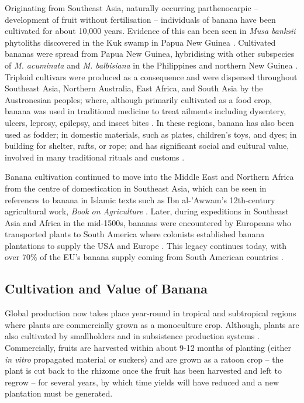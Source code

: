 Originating from Southeast Asia, naturally occurring parthenocarpic – development of fruit without fertilisation – individuals of banana have been cultivated for about 10,000 years. Evidence of this can been seen in \textit{Musa banksii} phytoliths discovered in the Kuk swamp in Papua New Guinea \parencite{Denham2011}.  Cultivated bananas were spread from Papua New Guinea, hybridising with other subspecies of \textit{M. acuminata} and \textit{M. balbisiana} in the Philippines and northern New Guinea \parencite{Perrier2009}. Triploid cultivars were produced as a consequence and were dispersed throughout Southeast Asia, Northern Australia, East Africa, and South Asia by the Austronesian peoples; where, although primarily cultivated as a food crop, banana was used in traditional medicine to treat ailments including dysentery, ulcers, leprosy, epilepsy, and insect bites \parencite{Kumar2012}. In these regions, banana has also been used as fodder; in domestic materials, such as plates, children’s toys, and dyes; in building for shelter, rafts, or rope; and has significant social and cultural value, involved in many traditional rituals and customs \parencite{Hapsari2017} .  

Banana cultivation continued to move into the Middle East and Northern Africa from the centre of domestication in Southeast Asia, which can be seen in references to banana in Islamic texts such as Ibn al-'Awwam's 12th-century agricultural work, \textit{Book on Agriculture} \parencite{Clement1866}. Later, during expeditions in Southeast Asia and Africa in the mid-1500s, bananas were encountered by Europeans who transported plants to South America where colonists established banana plantations to supply the USA and Europe \parencite{Guzman-Rivas1960, Salas-Pascual2022}. This legacy continues today, with over 70\% of the EU’s banana supply coming from South American countries \parencite{EuropeanUnion2022}.  

\subsection{Cultivation and Value of Banana}

Global production now takes place year-round in tropical and subtropical regions where plants are commercially grown as a monoculture crop. Although, plants are also cultivated by smallholders and in subsistence production systems \parencite{Viljoen2020}. Commercially, fruits are harvested within about 9-12 months of planting (either\textit{ in vitro} propagated material or suckers) and are grown as a ratoon crop – the plant is cut back to the rhizome once the fruit has been harvested and left to regrow – for several years, by which time yields will have reduced and a new plantation must be generated. 

